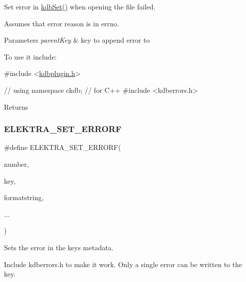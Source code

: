 Set error in \hyperlink{group__kdb_ga11436b058408f83d303ca5e996832bcf}{kdb\+Set()} when opening the file failed. 

Assumes that error reason is in {\ttfamily errno}.


\begin{DoxyParams}{Parameters}
{\em parent\+Key} & key to append error to\\
\hline
\end{DoxyParams}
To use it include\+:


\begin{DoxyCodeInclude}
\textcolor{preprocessor}{#include <\hyperlink{kdbplugin_8h}{kdbplugin.h}>}
\end{DoxyCodeInclude}

\begin{DoxyCodeInclude}
\textcolor{comment}{// using namespace ckdb; // for C++}
\textcolor{preprocessor}{#include <kdberrors.h>}
\end{DoxyCodeInclude}
 \begin{DoxyReturn}{Returns}

\end{DoxyReturn}
\mbox{\label{group__plugin_ga3e4fc2c20d8e64bed7a54bb1af882e34}} 
\subsubsection{\texorpdfstring{E\+L\+E\+K\+T\+R\+A\+\_\+\+S\+E\+T\+\_\+\+E\+R\+R\+O\+RF}{ELEKTRA\_SET\_ERRORF}}
{\footnotesize\ttfamily \#define E\+L\+E\+K\+T\+R\+A\+\_\+\+S\+E\+T\+\_\+\+E\+R\+R\+O\+RF(\begin{DoxyParamCaption}\item[{}]{number,  }\item[{}]{key,  }\item[{}]{formatstring,  }\item[{}]{... }\end{DoxyParamCaption})}



Sets the error in the keys metadata. 

Include kdberrors.\+h to make it work. Only a single error can be written to the key.



